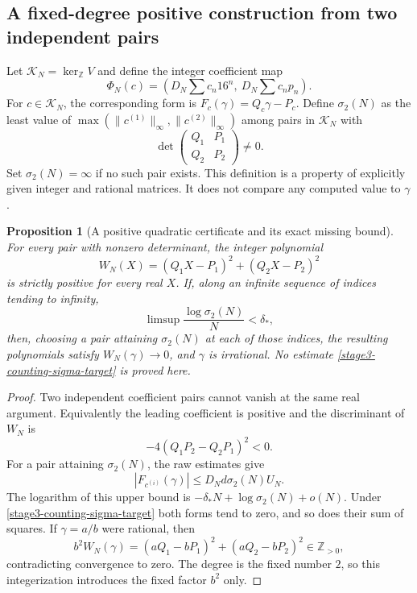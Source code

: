 \documentclass[11pt,a4paper]{article}
\newtheorem{proposition}[theorem]{Proposition}
\theoremstyle{definition}
\theoremstyle{remark}
\begin{document}
\subsection{A fixed-degree positive construction from two independent pairs}
Let $\mathcal K_N=\ker_{\mathbb Z}V$ and define the integer coefficient
map
\[
 \Phi_N(c)=\left(D_N\sum c_n16^n,\ D_N\sum c_np_n\right).
\]
For $c\in\mathcal K_N$, the corresponding form is
$F_c(\gamma)=Q_c\gamma-P_c$. Define $\sigma_2(N)$ as the least value of
$\max(\|c^{(1)}\|_\infty,\|c^{(2)}\|_\infty)$ among pairs in
$\mathcal K_N$ with
\[
 \det\begin{pmatrix}Q_1&P_1\\Q_2&P_2\end{pmatrix}\ne0.
\]
Set $\sigma_2(N)=\infty$ if no such pair exists. This definition is a
property of explicitly given integer and rational matrices. It does
not compare any computed value to $\gamma$.

\begin{proposition}[A positive quadratic certificate and its exact missing bound]
\label{stage3-counting-independent-pair}
For every pair with nonzero determinant, the integer polynomial
\[
 W_N(X)=(Q_1X-P_1)^2+(Q_2X-P_2)^2
\]
is strictly positive for every real $X$. If, along an infinite sequence
of indices tending to infinity,
\begin{equation}\label{stage3-counting-sigma-target}
 \limsup\frac{\log\sigma_2(N)}N<\delta_*,
\end{equation}
then, choosing a pair attaining $\sigma_2(N)$ at each of those indices,
the resulting polynomials satisfy $W_N(\gamma)\to0$, and $\gamma$ is irrational.
No estimate \eqref{stage3-counting-sigma-target} is proved here.
\end{proposition}

\begin{proof}
Two independent coefficient pairs cannot vanish at the same real
argument. Equivalently the leading coefficient is positive and the
discriminant of $W_N$ is
\[
 -4(Q_1P_2-Q_2P_1)^2<0.
\]
For a pair attaining $\sigma_2(N)$, the raw estimates give
\[
 |F_{c^{(i)}}(\gamma)|\le D_Nd\sigma_2(N)U_N.
\]
The logarithm of this upper bound is
$-\delta_*N+\log\sigma_2(N)+o(N)$. Under
\eqref{stage3-counting-sigma-target} both forms tend to zero, and so
does their sum of squares. If $\gamma=a/b$ were rational, then
\[
 b^2W_N(\gamma)
 =(aQ_1-bP_1)^2+(aQ_2-bP_2)^2\in\mathbb Z_{>0},
\]
contradicting convergence to zero. The degree is the fixed number $2$,
so this integerization introduces the fixed factor $b^2$ only.
\end{proof}
\end{document}

